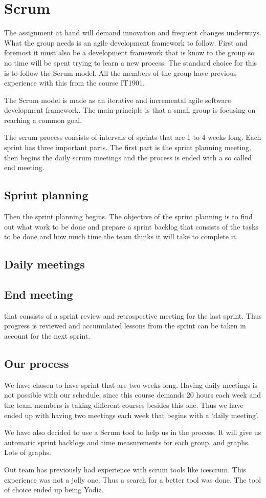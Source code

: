 \section{Scrum}

The assignment at hand will demand innovation and frequent changes underways.
What the group needs is an agile development framework to follow. First and foremost it must also be a development framework that is know to the group so no time will be spent trying to learn a new process. 
The standard choice for this is to follow the Scrum model. All the members of the group have previous experience with this from the course IT1901.

The Scrum model is made as an iterative and incremental agile software development framework.
The main principle is that a small group is focusing on reaching a common goal.

The scrum process consists of intervals of sprints that are 1 to 4 weeks long. Each sprint has three important parts.
The first part is the sprint planning meeting, then begins the daily scrum meetings and the process is ended with a so called end meeting.

\subsection{Sprint planning}
Then the sprint planning begins. The objective of the sprint planning is to find out what work to be done and prepare a
sprint backlog that consists of the tasks to be done and how much time the team thinks it will take to complete it.

\subsection{Daily meetings}


\subsection{End meeting}
that consists of  a sprint review and retrospective meeting for the last sprint.
Thus progress is reviewed and accumulated lessons from the sprint can be taken in account for the next sprint.


\subsection{Our process}
We have chosen to have sprint that are two weeks long. Having daily meetings is not possible with our schedule,
since this course demands 20 hours each week and the team members is taking different courses besides this one.
Thus we have ended up with having two meetings each week that begins with a ‘daily meeting’.

We have also decided to use a Scrum tool to help us in the process.
It will give us automatic sprint backlogs and time measurements for each group, and graphs. Lots of graphs.

Out team has previously had experience with scrum tools like icescrum. This experience was not a jolly one.
Thus a search for a better tool was done. The tool of choice ended up being Yodiz.
